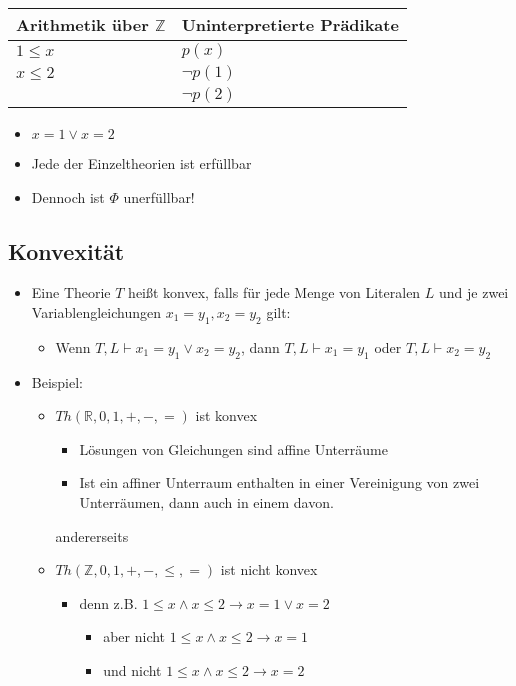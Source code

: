 \documentclass{scrartcl}
\begin{document}
\begin{tabular}{|l|l|}
	\hline
	Arithmetik über $ \mathbb{Z} $ & Uninterpretierte Prädikate \\
	\hline 
	$ 1 \leq x $ & $ p(x) $ \\ 
	\hline 
	$ x \leq 2 $ & $ \neg p(1) $ \\ 
	\hline 
	& $ \neg p(2) $ \\ 
	\hline 
\end{tabular} 

\begin{itemize}
	\item $ x = 1 \vee x = 2 $
	\item Jede der Einzeltheorien ist erfüllbar
	\item Dennoch ist $ \Phi $ unerfüllbar!
\end{itemize}

\subsection{Konvexität}

\begin{itemize}
	\item Eine Theorie $ T $ heißt konvex, falls für jede Menge von Literalen $ L $ und je zwei Variablengleichungen $ x_1 = y_1, x_2 = y_2 $ gilt:
	\begin{itemize}
		\item Wenn $ T,L \vdash x_1 = y_1 \vee x_2 = y_2 $, dann $ T,L \vdash x_1 = y_1 $ oder $ T,L \vdash x_2 = y_2 $
	\end{itemize}
	\item Beispiel:
	\begin{itemize}
		\item $ Th(\mathbb{R},0,1,+,-,=) $ ist konvex
		\begin{itemize}
			\item Lösungen von Gleichungen sind affine Unterräume
			\item Ist ein affiner Unterraum enthalten in einer Vereinigung von zwei Unterräumen, dann auch in einem davon.
		\end{itemize}
		andererseits
		\item $ Th(\mathbb{Z},0,1,+,-,\leq,=) $ ist nicht konvex
		\begin{itemize}
			\item denn z.B. $ 1 \leq x \wedge x \leq 2 \rightarrow x = 1 \vee x = 2 $
			\begin{itemize}
				\item aber nicht $ 1 \leq x \wedge x \leq 2 \rightarrow x = 1 $
				\item und nicht $ 1 \leq x \wedge x \leq 2 \rightarrow x = 2 $
			\end{itemize}
		\end{itemize}
	\end{itemize}
\end{itemize}
\end{document}
